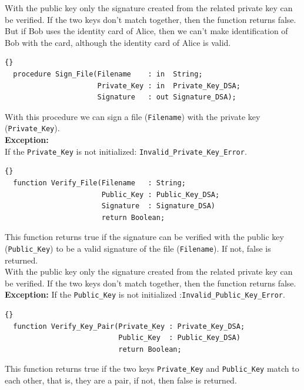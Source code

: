 With the public key only the signature created from the
related private key can be verified. If the two keys don't match
together, then the function returns false.\\

But if Bob uses the
identity card of Alice, then we can't make identification of Bob with
the card, although the identity card of Alice is valid.

\hhline
\begin{lstlisting}{}
  procedure Sign_File(Filename    : in  String;
                      Private_Key : in  Private_Key_DSA;
                      Signature   : out Signature_DSA);
\end{lstlisting}
With this procedure we can sign a file (\texttt{Filename}) with the
private key (\texttt{Private\_Key}).\\

\noindent\textbf{Exception:}\\
 If the \texttt{Private\_Key} is not initialized:\quad
 \texttt{Invalid\_Private\_Key\_Error}.

\begin{lstlisting}{}
  function Verify_File(Filename   : String;
                       Public_Key : Public_Key_DSA;
                       Signature  : Signature_DSA)
                       return Boolean;
\end{lstlisting}
This function returns true if the signature can be verified with the
public key (\texttt{Public\_Key}) to be a valid signature of the file
(\texttt{Filename}). If not, false is returned.\\

With the public key only the signature created from the related
private key can be verified. If the two keys don't match together,
then the function returns false.\\


\noindent\textbf{Exception:}
If the \texttt{Public\_Key} is not initialized :\quad \texttt{Invalid\_Public\_Key\_Error}.

\hhline
\begin{lstlisting}{}
  function Verify_Key_Pair(Private_Key : Private_Key_DSA;
                           Public_Key  : Public_Key_DSA) 
                           return Boolean;
\end{lstlisting}
This function returns true if the two keys \texttt{Private\_Key} and
\texttt{Public\_Key} match to each other, that is, they are a pair, if
not, then false is returned.

